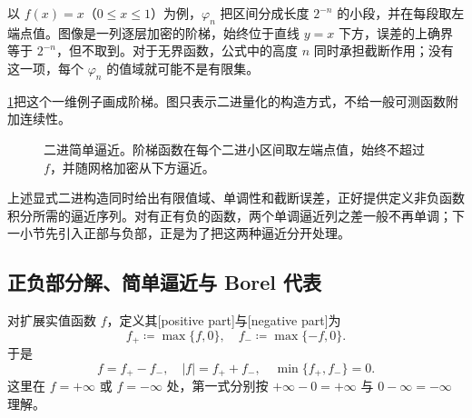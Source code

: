 以 \(f(x)=x\)（\(0\leq x\leq1\)）为例，\(\varphi_n\) 把区间分成长度 \(2^{-n}\) 的小段，并在每段取左端点值。图像是一列逐层加密的阶梯，始终位于直线 \(y=x\) 下方，误差的上确界等于 \(2^{-n}\)，但不取到。对于无界函数，公式中的高度 \(n\) 同时承担截断作用；没有这一项，每个 \(\varphi_n\) 的值域就可能不是有限集。

\ProseParagraphBreak

\cref{b1:fig:dyadic-simple-approximation}把这个一维例子画成阶梯。图只表示二进量化的构造方式，不给一般可测函数附加连续性。

\begin{figure}[htbp]
\centering
{}
\caption[二进简单逼近]{二进简单逼近。阶梯函数在每个二进小区间取左端点值，始终不超过 \(f\)，并随网格加密从下方逼近。}
\label{b1:fig:dyadic-simple-approximation}
\end{figure}

上述显式二进构造同时给出有限值域、单调性和截断误差，正好提供定义非负函数积分所需的逼近序列。对有正有负的函数，两个单调逼近列之差一般不再单调；下一小节先引入正部与负部，正是为了把这两种逼近分开处理。

\subsection{正负部分解、简单逼近与 Borel 代表}
\label{b1:subsec:040303}

\begin{definition}
\label{b1:def:positive-negative-parts}
对扩展实值函数 \(f\)，定义其[positive part]与[negative part]为
\[
f_+\coloneqq\max\{f,0\},
\quad
f_-\coloneqq\max\{-f,0\}.
\]
于是
\[
f=f_+-f_-,
\quad
|f|=f_++f_-,
\quad
\min\{f_+,f_-\}=0.
\]
这里在 \(f=+\infty\) 或 \(f=-\infty\) 处，第一式分别按
\(+\infty-0=+\infty\) 与 \(0-\infty=-\infty\) 理解。
\end{definition}

